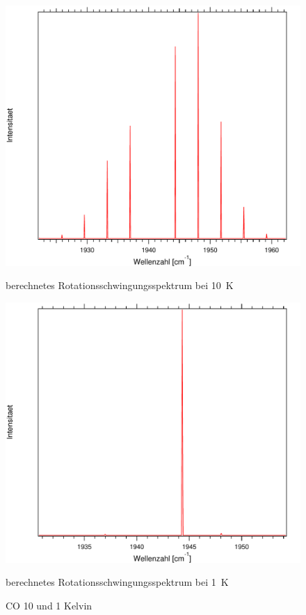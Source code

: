 \begin{figure}[H]
\centering	
	\begin{minipage}{0.47\linewidth}
	\includegraphics[width=\linewidth]{Bilder/10CO.pdf}
	\caption{berechnetes Rotationsschwingungsspektrum bei 10~K}
	\end{minipage}
\begin{minipage}{0.47\linewidth}
	\includegraphics[width=\linewidth]{Bilder/1CO.pdf}
	\caption{berechnetes Rotationsschwingungsspektrum bei 1~K}
	\end{minipage}
	
	\caption{CO 10 und 1 Kelvin}
	
	
\end{figure}

